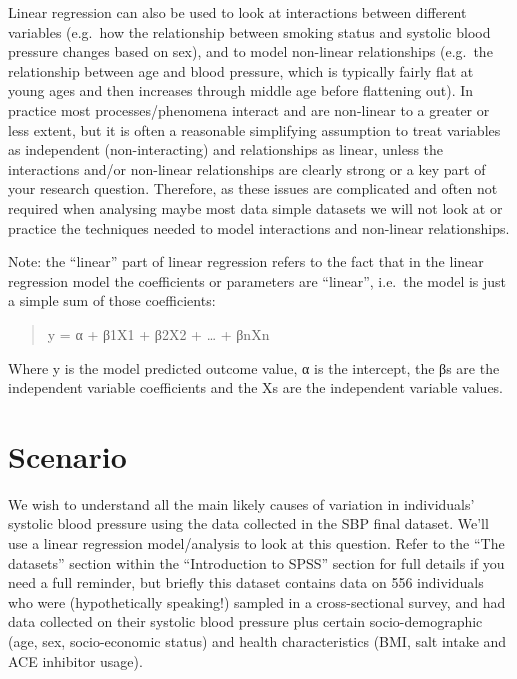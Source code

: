 \documentclass[
]{book}
\begin{document}
Linear regression can also be used to look at interactions between different variables (e.g.~how the relationship between smoking status and systolic blood pressure changes based on sex), and to model non-linear relationships (e.g.~the relationship between age and blood pressure, which is typically fairly flat at young ages and then increases through middle age before flattening out). In practice most processes/phenomena interact and are non-linear to a greater or less extent, but it is often a reasonable simplifying assumption to treat variables as independent (non-interacting) and relationships as linear, unless the interactions and/or non-linear relationships are clearly strong or a key part of your research question. Therefore, as these issues are complicated and often not required when analysing maybe most data simple datasets we will not look at or practice the techniques needed to model interactions and non-linear relationships.

Note: the ``linear'' part of linear regression refers to the fact that in the linear regression model the coefficients or parameters are ``linear'', i.e.~the model is just a simple sum of those coefficients:

\begin{quote}
y = α + β1X1 + β2X2 + \ldots{} + βnXn
\end{quote}

Where y is the model predicted outcome value, α is the intercept, the βs are the independent variable coefficients and the Xs are the independent variable values.

\hypertarget{scenario-11}{%
\section{Scenario}\label{scenario-11}}

We wish to understand all the main likely causes of variation in individuals' systolic blood pressure using the data collected in the SBP final dataset. We'll use a linear regression model/analysis to look at this question. Refer to the ``The datasets'' section within the ``Introduction to SPSS'' section for full details if you need a full reminder, but briefly this dataset contains data on 556 individuals who were (hypothetically speaking!) sampled in a cross-sectional survey, and had data collected on their systolic blood pressure plus certain socio-demographic (age, sex, socio-economic status) and health characteristics (BMI, salt intake and ACE inhibitor usage).
\end{document}

